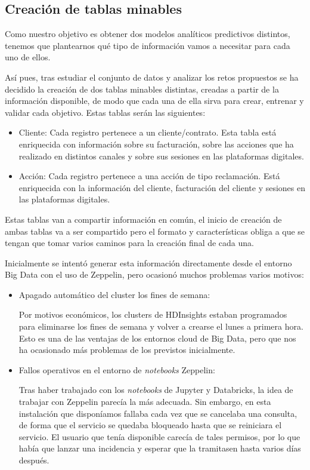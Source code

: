 \subsection{Creación de tablas minables}
Como nuestro objetivo es obtener dos modelos analíticos predictivos distintos, tenemos que plantearnos qué tipo de información vamos a necesitar para cada uno de ellos.

Así pues, tras estudiar el conjunto de datos y analizar los retos propuestos se ha decidido la creación de dos tablas minables distintas, creadas a partir de la información disponible, de modo que cada una de ella sirva para crear, entrenar y validar cada objetivo.
Estas tablas serán las siguientes:
\begin{itemize}
    \item Cliente: Cada registro pertenece a un cliente/contrato. Esta tabla está  enriquecida con información sobre su facturación, sobre las acciones que ha realizado en distintos canales y sobre sus sesiones en las plataformas digitales.
    \item Acción: Cada registro pertenece a una acción de tipo reclamación. Está enriquecida con la información del cliente, facturación del cliente y sesiones en las plataformas digitales.
\end{itemize}

Estas tablas van a compartir información en común, el inicio de creación de ambas tablas va a ser compartido pero el formato y características obliga a que se tengan que tomar varios caminos para la creación final de cada una.

Inicialmente se intentó generar esta información directamente desde el entorno Big Data con el uso de Zeppelin\cite{zeppelin}, pero ocasionó muchos problemas varios motivos:
\begin{itemize}
    \item Apagado automático del cluster los fines de semana:
    
    Por motivos económicos, los clusters de HDInsights estaban programados para eliminarse los fines de semana y volver a crearse el lunes a primera hora. Esto es una de las ventajas de los entornos cloud de Big Data, pero que nos ha ocasionado más problemas de los previstos inicialmente. 
    \item Fallos operativos en el entorno de \textit{notebooks} Zeppelin:
    
    Tras haber trabajado con los \textit{notebooks} de Jupyter\cite{jupyter} y Databricks, la idea de trabajar con Zeppelin parecía la más adecuada. Sin embargo, en esta instalación que disponíamos fallaba cada vez que se cancelaba una consulta, de forma que el servicio se quedaba bloqueado hasta que se reiniciara el servicio. El usuario que tenía disponible carecía de tales permisos, por lo que había que lanzar una incidencia y esperar que la tramitasen hasta varios días después.
\end{itemize}


